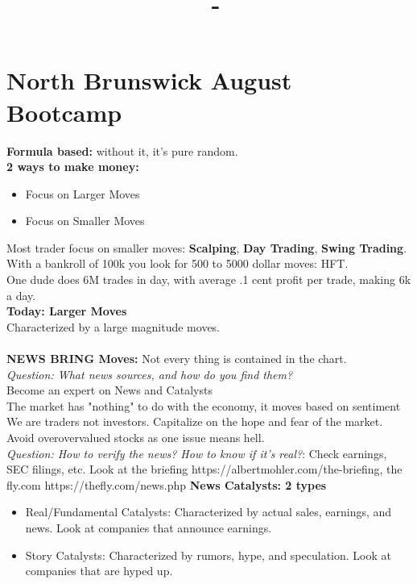 \documentclass[answers,12pt,addpoints]{exam}
\author{\name}
\title{\course \ - \assignment}
\begin{document}
\maketitle
\tableofcontents
\newpage

\section{North Brunswick August Bootcamp}

\textbf{Formula based:} without it, it's pure random.\\
\textbf{2 ways to make money:}
\begin{itemize}
    \item Focus on Larger Moves
    \item Focus on Smaller Moves
\end{itemize}
Most trader focus on smaller moves: \textbf{Scalping}, \textbf{Day Trading}, \textbf{Swing Trading}.\\
With a bankroll of 100k you look for 500 to 5000 dollar moves: HFT.\\
One dude does 6M trades in day, with average .1 cent profit per trade, making 6k a day.\\
\textbf{Today: Larger Moves}\\
Characterized by a large magnitude moves.\\\\
\textbf{NEWS BRING Moves:} Not every thing is contained in the chart.\\
\textit{Question: What news sources, and how do you find them?}\\
Become an expert on News and Catalysts\\
The market has "nothing" to do with the economy, it moves based on sentiment\\
We are traders not investors. Capitalize on the hope and fear of the market.\\
Avoid overovervalued stocks as one issue means hell.\\
\textit{Question: How to verify the news? How to know if it's real?}: Check earnings, SEC filings, etc. Look at the briefing https://albertmohler.com/the-briefing, the fly.com
https://thefly.com/news.php
\textbf{News Catalysts: 2 types}
\begin{itemize}
    \item Real/Fundamental Catalysts: Characterized by actual sales, earnings, and news. Look at companies that announce earnings.
    \item Story Catalysts: Characterized by rumors, hype, and speculation. Look at companies that are hyped up.
\end{itemize}
\end{document}
